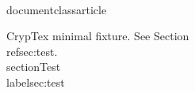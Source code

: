 \\documentclass{article}
\begin{document}
CrypTex minimal fixture. See Section~\\ref{sec:test}.
\\section{Test}\\label{sec:test}
\
\end{document}
